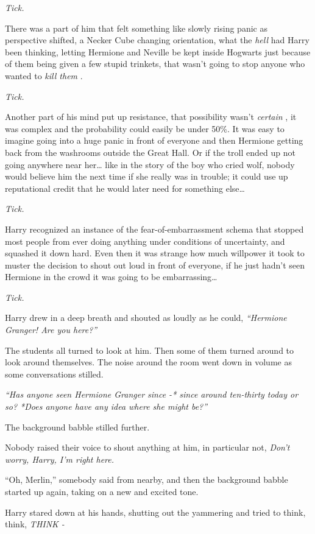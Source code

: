 \emph{Tick.}

There was a part of him that felt something like slowly rising panic as
perspective shifted, a Necker Cube changing orientation, what the
\emph{hell} had Harry been thinking, letting Hermione and Neville be
kept inside Hogwarts just because of them being given a few stupid
trinkets, that wasn't going to stop anyone who wanted to \emph{kill
them} .

\emph{Tick.}

Another part of his mind put up resistance, that possibility wasn't
\emph{certain} , it was complex and the probability could easily be
under 50\%. It was easy to imagine going into a huge panic in front of
everyone and then Hermione getting back from the washrooms outside the
Great Hall. Or if the troll ended up not going anywhere near her\ldots{}
like in the story of the boy who cried wolf, nobody would believe him
the next time if she really was in trouble; it could use up reputational
credit that he would later need for something else\ldots{}

\emph{Tick.}

Harry recognized an instance of the fear-of-embarrassment schema that
stopped most people from ever doing anything under conditions of
uncertainty, and squashed it down hard. Even then it was strange how
much willpower it took to muster the decision to shout out loud in front
of everyone, if he just hadn't seen Hermione in the crowd it was going
to be embarrassing\ldots{}

\emph{Tick.}

Harry drew in a deep breath and shouted as loudly as he could,
\emph{``Hermione Granger! Are you here?''}

The students all turned to look at him. Then some of them turned around
to look around themselves. The noise around the room went down in volume
as some conversations stilled.

\emph{``Has anyone seen Hermione Granger since -* since around
ten-thirty today or so? *Does anyone have any idea where she might
be?''}

The background babble stilled further.

Nobody raised their voice to shout anything at him, in particular not,
\emph{Don't worry, Harry, I'm right here.}

``Oh, Merlin,'' somebody said from nearby, and then the background
babble started up again, taking on a new and excited tone.

Harry stared down at his hands, shutting out the yammering and tried to
think, think, \emph{THINK -}


